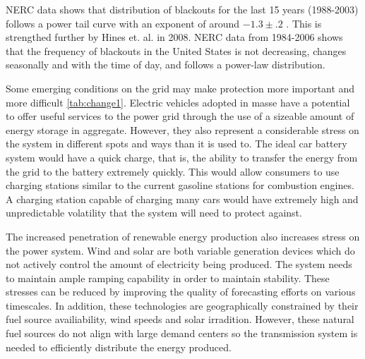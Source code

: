 NERC data shows that distribution of blackouts for the last 15 years (1988-2003) follows a power tail curve with an exponent of around $-1.3\pm.2$ \cite{carreras_2004}. This is strengthed further by Hines et. al. in 2008.  NERC data from 1984-2006 shows that the frequency of blackouts in the United States is not decreasing, changes seasonally and with the time of day, and follows a power-law distribution.\cite{hines_2008} \cite{hines_2009}

Some emerging conditions on the grid may make protection more important and more difficult \ref{tab:change1}.  Electric vehicles adopted in masse have a potential to offer useful services to the power grid through the use of a sizeable amount of energy storage in aggregate.  However, they also represent a considerable stress on the system in different spots and ways than it is used to.  The ideal car battery system would have a quick charge, that is, the ability to transfer the energy from the grid to the battery extremely quickly.  This would allow consumers to use charging stations similar to the current gasoline stations for combustion engines.  A charging station capable of charging many cars would have extremely high and unpredictable volatility that the system will need to protect against.

The increased penetration of renewable energy production also increases stress on the power system.  Wind and solar are both variable generation devices which do not actively control the amount of electricity being produced.  The system needs to maintain ample ramping capability in order to maintain stability.  These stresses can be reduced by improving the quality of forecasting efforts on various timescales.  In addition, these technologies are geographically constrained by their fuel source availiability, wind speeds and solar irradition.  However, these natural fuel sources do not align with large demand centers so the transmission system is needed to efficiently distribute the energy produced.

